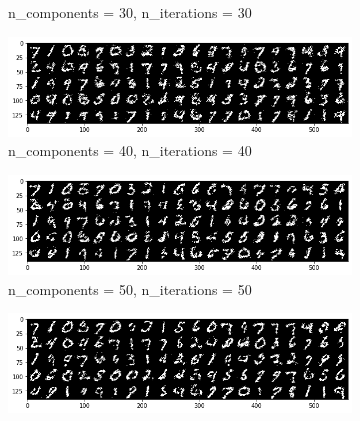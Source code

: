 \begin{figure}[ht]
\begin{subfigure}[b]{0.33\textwidth}
		\caption{n\_components = 30, n\_iterations = 30}\label{fig:rbm_ncomp_30_itr_30}
	\end{subfigure}
	\begin{subfigure}[b]{0.33\textwidth}
		\centering
		\captionsetup{width=0.8\linewidth, format = hang}
		\includegraphics[height = 0.5\textwidth,width = 1\textwidth]{Exercise4/Report/rbm_ncomp_40_itr_40}
		\caption{n\_components = 40, n\_iterations = 40}\label{fig:rbm_ncomp_40_itr_40)}
	\end{subfigure}%
	\begin{subfigure}[b]{0.33\textwidth}
		\centering
		\captionsetup{width=0.8\linewidth, format = hang}
		\includegraphics[height = 0.5\textwidth,width = 1\textwidth]{Exercise4/Report/rbm_ncomp_50_itr_50}
		\caption{n\_components = 50, n\_iterations = 50}\label{fig:rbm_ncomp_50_itr_50)}
	\end{subfigure}%
	\begin{subfigure}[b]{0.33\textwidth}
		\centering
		\captionsetup{width=0.8\linewidth, format = hang}
		\includegraphics[height = 0.5\textwidth,width = 1\textwidth]{Exercise4/Report/rbm_ncomp_60_itr_60}

\end{subfigure}
\end{figure}
